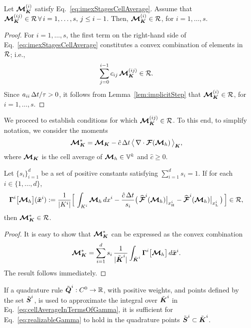 \begin{lemma}
  Let $\boldsymbol{\mathcal{M}}_{\boldsymbol{K}}^{(i)}$ satisfy Eq.~\eqref{eq:imexStagesCellAverage}.
  Assume that $\boldsymbol{\mathcal{M}}_{\boldsymbol{K}}^{(ij)}\in\mathcal{R}\,\forall\,i=1,\ldots,s,\,j\le i-1$.  
  Then, $\boldsymbol{\mathcal{M}}_{\boldsymbol{K}}^{(i)}\in\mathcal{R}$, for $i=1,\ldots,s$.  
\end{lemma}
\begin{proof}
  For $i=1,\ldots,s$, the first term on the right-hand side of Eq.~\eqref{eq:imexStagesCellAverage} constitutes a convex combination of elements in $\mathcal{R}$; i.e.,
  \begin{equation*}
    \sum_{j=0}^{i-1}c_{ij}\,\boldsymbol{\mathcal{M}}_{\boldsymbol{K}}^{(ij)}\in\mathcal{R}.
  \end{equation*}
  Since $a_{ii}\,\Delta t/\tau>0$, it follows from Lemma~\ref{lem:implicitStep} that $\boldsymbol{\mathcal{M}}_{\boldsymbol{K}}^{(i)}\in\mathcal{R}$, for $i=1,\ldots,s$.  
\end{proof}

We proceed to establish conditions for which $\boldsymbol{\mathcal{M}}_{\boldsymbol{K}}^{(ij)}\in\mathcal{R}$.  
To this end, to simplify notation, we consider the moments
\begin{equation}
  \boldsymbol{\mathcal{M}}_{\boldsymbol{K}}^{*}
  =\boldsymbol{\mathcal{M}}_{\boldsymbol{K}}-\hat{c}\,\Delta t\,\big\langle\,\nabla\cdot\boldsymbol{\mathcal{F}}(\boldsymbol{\mathcal{M}}_{h})\,\big\rangle_{\boldsymbol{K}},
\end{equation}
where $\boldsymbol{\mathcal{M}}_{\boldsymbol{K}}$ is the cell average of $\boldsymbol{\mathcal{M}}_{h}\in\mathbb{V}^{k}$ and $\hat{c}\ge0$.  
\begin{lemma}
  Let $\{s_{i}\}_{i=1}^{d}$ be a set of positive constants satisfying $\sum_{i=1}^{d}s_{i}=1$.  
  If for each $i\in\{1,\ldots,d\}$, 
  \begin{equation}
    \boldsymbol{\Gamma}^{i}\big[\boldsymbol{\mathcal{M}}_{h}\big](\tilde{\boldsymbol{x}}^{i})
    :=\frac{1}{|K^{i}|}
    \Big[\,\int_{K^{i}}\boldsymbol{\mathcal{M}}_{h}\,dx^{i}-\frac{\hat{c}\,\Delta t}{s_{i}}\big(\,\widehat{\boldsymbol{\mathcal{F}}}^{i}(\boldsymbol{\mathcal{M}}_{h})\big|_{x_{\mbox{\tiny H}}^{i}}-\widehat{\boldsymbol{\mathcal{F}}}^{i}(\boldsymbol{\mathcal{M}}_{h})\big|_{x_{\mbox{\tiny L}}^{i}}\,\big)\,\Big]\in\mathcal{R},
    \label{eq:realizableGamma}
  \end{equation}
  then $\boldsymbol{\mathcal{M}}_{\boldsymbol{K}}^{*}\in\mathcal{R}$.  
\end{lemma}
\begin{proof}
  It is easy to show that $\boldsymbol{\mathcal{M}}_{\boldsymbol{K}}^{*}$ can be expressed as the convex combination
  \begin{equation}
    \boldsymbol{\mathcal{M}}_{\boldsymbol{K}}^{*}
    =\sum_{i=1}^{d}s_{i}\,\frac{1}{|\tilde{\boldsymbol{\boldsymbol{K}}}^{i}|}\int_{\tilde{\boldsymbol{K}}^{i}}\boldsymbol{\Gamma}^{i}\big[\boldsymbol{\mathcal{M}}_{h}\big]\,d\tilde{\boldsymbol{x}}^{i}.  
    \label{eq:cellAverageInTermsOfGamma}
  \end{equation}
  The result follows immediately.  
\end{proof}
\begin{rem}
  If a quadrature rule $\tilde{\boldsymbol{Q}}^{i}:C^{0}\to\mathbb{R}$, with positive weights, and points defined by the set $\tilde{\boldsymbol{S}}^{i}$, is used to approximate the integral over $\tilde{\boldsymbol{K}}^{i}$ in Eq.~\eqref{eq:cellAverageInTermsOfGamma}, it is sufficient for Eq.~\eqref{eq:realizableGamma} to hold in the quadrature points $\tilde{\boldsymbol{S}}^{i}\subset\tilde{\boldsymbol{K}}^{i}$.  
\end{rem}

